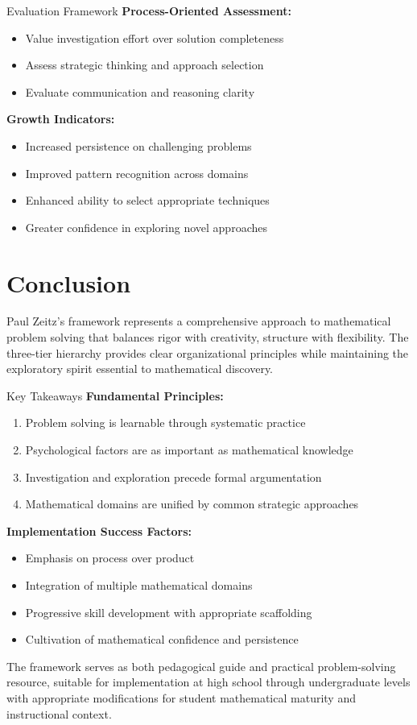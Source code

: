 \documentclass[12pt]{article}
\begin{document}
	\begin{strategybox}{Evaluation Framework}
		\textbf{Process-Oriented Assessment:}
		\begin{itemize}
			\item Value investigation effort over solution completeness
			\item Assess strategic thinking and approach selection
			\item Evaluate communication and reasoning clarity
		\end{itemize}
		
		\textbf{Growth Indicators:}
		\begin{itemize}
			\item Increased persistence on challenging problems
			\item Improved pattern recognition across domains
			\item Enhanced ability to select appropriate techniques
			\item Greater confidence in exploring novel approaches
		\end{itemize}
	\end{strategybox}
	
	\section{Conclusion}
	
	Paul Zeitz's framework represents a comprehensive approach to mathematical problem solving that balances rigor with creativity, structure with flexibility. The three-tier hierarchy provides clear organizational principles while maintaining the exploratory spirit essential to mathematical discovery.
	
	\begin{strategybox}{Key Takeaways}
		\textbf{Fundamental Principles:}
		\begin{enumerate}
			\item Problem solving is learnable through systematic practice
			\item Psychological factors are as important as mathematical knowledge
			\item Investigation and exploration precede formal argumentation
			\item Mathematical domains are unified by common strategic approaches
		\end{enumerate}
		
		\textbf{Implementation Success Factors:}
		\begin{itemize}
			\item Emphasis on process over product
			\item Integration of multiple mathematical domains
			\item Progressive skill development with appropriate scaffolding
			\item Cultivation of mathematical confidence and persistence
		\end{itemize}
	\end{strategybox}
	
	The framework serves as both pedagogical guide and practical problem-solving resource, suitable for implementation at high school through undergraduate levels with appropriate modifications for student mathematical maturity and instructional context.
	
\end{document}
